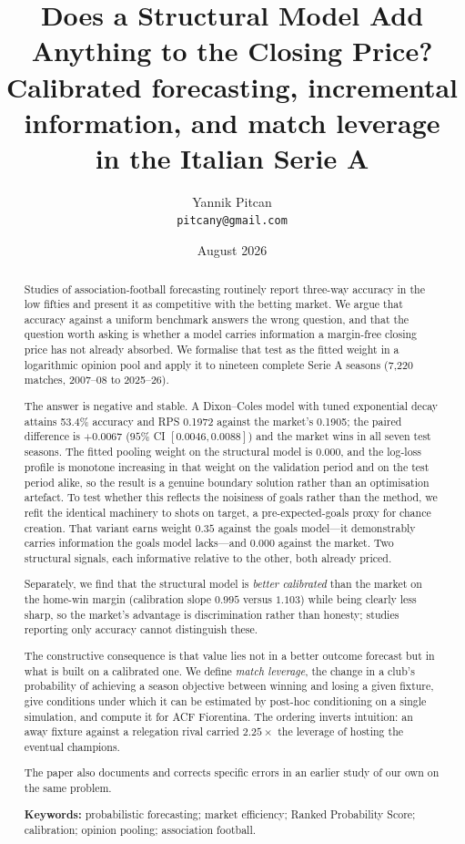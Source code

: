 \documentclass[11pt]{article}
\title{\bfseries Does a Structural Model Add Anything to the Closing Price?\\[4pt]
\large Calibrated forecasting, incremental information, and match leverage\\
in the Italian Serie A}
\author{Yannik Pitcan\\
\small \texttt{pitcany@gmail.com}}
\date{August 2026}
\begin{document}
\maketitle

\begin{abstract}
\noindent
Studies of association-football forecasting routinely report three-way accuracy
in the low fifties and present it as competitive with the betting market. We
argue that accuracy against a uniform benchmark answers the wrong question, and
that the question worth asking is whether a model carries information a
margin-free closing price has not already absorbed. We formalise that test as
the fitted weight in a logarithmic opinion pool and apply it to nineteen
complete Serie A seasons (7{,}220 matches, 2007--08 to 2025--26).

The answer is negative and stable. A Dixon--Coles model with tuned exponential
decay attains 53.4\% accuracy and RPS 0.1972 against the market's 0.1905; the
paired difference is $+0.0067$ ($95\%$ CI $[0.0046, 0.0088]$) and the market
wins in all seven test seasons. The fitted pooling weight on the structural
model is $0.000$, and the log-loss profile is monotone increasing in that
weight on the validation period and on the test period alike, so the result is
a genuine boundary solution rather than an optimisation artefact. To test
whether this reflects the noisiness of goals rather than the method, we refit
the identical machinery to shots on target, a pre-expected-goals proxy for
chance creation. That variant earns weight $0.35$ against the goals model---it
demonstrably carries information the goals model lacks---and $0.000$ against
the market. Two structural signals, each informative relative to the other,
both already priced.

Separately, we find that the structural model is \emph{better calibrated} than
the market on the home-win margin (calibration slope $0.995$ versus $1.103$)
while being clearly less sharp, so the market's advantage is discrimination
rather than honesty; studies reporting only accuracy cannot distinguish these.

The constructive consequence is that value lies not in a better outcome
forecast but in what is built on a calibrated one. We define \emph{match
leverage}, the change in a club's probability of achieving a season objective
between winning and losing a given fixture, give conditions under which it can
be estimated by post-hoc conditioning on a single simulation, and compute it
for ACF Fiorentina. The ordering inverts intuition: an away fixture against a
relegation rival carried $2.25\times$ the leverage of hosting the eventual
champions.

The paper also documents and corrects specific errors in an earlier study of
our own on the same problem.

\medskip
\noindent\textbf{Keywords:} probabilistic forecasting; market efficiency;
Ranked Probability Score; calibration; opinion pooling; association football.
\end{abstract}
\end{document}
